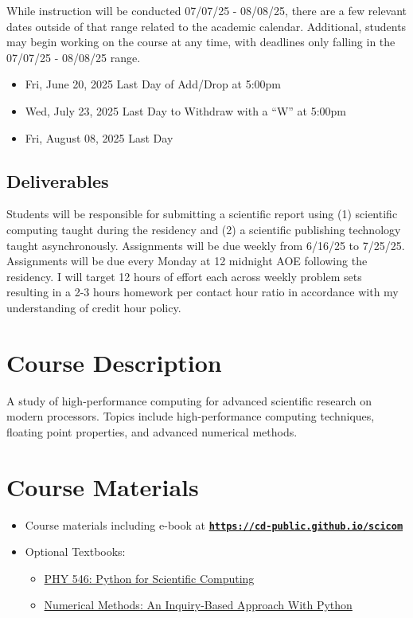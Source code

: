 \documentclass[11pt]{article}
\begin{document}
While instruction will be conducted  07/07/25 - 08/08/25, there are a few relevant dates outside of that range related to the academic calendar. Additional, students may begin working on the course at any time, with deadlines only falling in the  07/07/25 - 08/08/25 range.

\begin{itemize}
	\item Fri, June 20, 2025 Last Day of Add/Drop at 5:00pm
	\item Wed, July 23, 2025 Last Day to Withdraw with a “W” at 5:00pm
	\item Fri, August 08, 2025 Last Day
\end{itemize}

\subsection*{Deliverables} 

Students will be responsible for submitting a scientific report using (1) scientific computing taught during the residency and (2) a scientific publishing technology taught asynchronously. Assignments will be due weekly from 6/16/25 to 7/25/25. Assignments will be due every Monday at 12 midnight AOE following the residency.  I
will target 12 hours of effort each across weekly problem sets resulting in a 2-3 hours homework
per contact hour ratio in accordance with my understanding of credit hour policy.


\section*{Course Description}

A study of high-performance computing for advanced scientific research on modern processors. Topics include high-performance computing techniques, floating point properties, and advanced numerical methods.


\section*{Course Materials}

\begin{itemize}
\item Course materials including e-book at \href{https://cd-public.github.io/scicom/}{\tt\bf https://cd-public.github.io/scicom}
\item Optional Textbooks: 
\begin{itemize}
\item \href{https://sbu-python-class.github.io/python-science/Introduction.html}{PHY 546: Python for Scientific Computing}
\item \href{https://numericalmethodssullivan.github.io/}{Numerical Methods: An Inquiry-Based Approach With Python }
\end{itemize}
\end{itemize}
\end{document}

